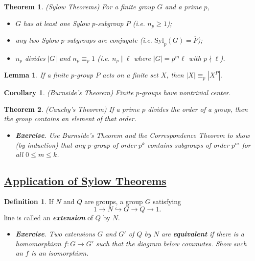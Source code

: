 \documentclass[11pt]{amsart}
\newtheorem*{theorem*}{Theorem}
\newtheorem*{lemma*}{Lemma}
\newtheorem*{corollary*}{Corollary}
\theoremstyle{definition}
\newtheorem*{definition*}{Definition}
\renewcommand\geq{\geqslant}
\renewcommand\leq{\leqslant}
\renewcommand\:{\colon}
\renewcommand\bar[1]{\overline{#1}}
\newcommand{\1}{\mathds{1}}
\newcommand{\Syl}{\text{Syl}}
\newcommand{\exc}[1]{\vspace{-2.5pt}\begin{itemize}[leftmargin=15pt]\item[$\RHD$] \textit{\textbf{Exercise}. #1}\end{itemize}}
\begin{document}
\begin{theorem*}
	\textnormal{(Sylow Theorems)} For a finite group $G$ and a prime $p$,
	\begin{itemize}[leftmargin=24.5pt]\setlength\itemsep{0pt}
		\item[\textnormal{(I)}] $G$ has at least one Sylow $p$-subgroup $P$ (i.e. $n_p \geq 1$);
		\item[\textnormal{(II)}] any two Sylow $p$-subgroups are conjugate (i.e. $\Syl_p(G) = \bar{P}$);
		\item[\textnormal{(III)}] $n_p$ divides $|G|$ and $n_p \equiv_p 1$ (i.e. $n_p \mid \ell$ where $|G| = p^m\ell$ with $p \nmid \ell$).
	\end{itemize}
\end{theorem*}

\begin{lemma*}
	If a finite $p$-group $P$ acts on a finite set $X$, then $|X| \equiv_p |X^P|$.
\end{lemma*} 

\begin{corollary*}
	\textnormal{(Burnside's Theorem)} Finite $p$-groups have nontrivial center.
\end{corollary*}

\begin{theorem*}
	\textnormal{(Cauchy's Theorem)} If a prime $p$ divides the order of a group, then the group contains an element of that order.
\end{theorem*}

\exc{Use Burnside's Theorem and the Correspondence Theorem to show (by induction) that any $p$-group of order $p^k$ contains subgroups of order $p^m$ for all $0 \leq m \leq k$.}

\vskip20pt



\subsection*{\underline{Application of Sylow Theorems}}

\begin{definition*}
	If $N$ and $Q$ are groups, a group $G$ satisfying 
		\[ 1 \to N \hookrightarrow G \to Q \to 1. \]
	line is called an \textbf{\textit{extension}} of $Q$ by $N$.
\end{definition*}

\exc{Two extensions $G$ and $G'$ of $Q$ by $N$ are \textbf{\textit{equivalent}} if there is a homomorphism $f\: G \to G'$ such that the diagram below commutes. Show such an $f$ is an isomorphism.}
\vskip-15pt
\begin{center}
\end{center}
\end{document}
